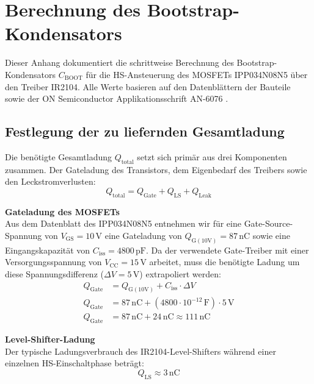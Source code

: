 
\section{Berechnung des Bootstrap-Kondensators}
\label{app:bootstrap}

Dieser Anhang dokumentiert die schrittweise Berechnung des Bootstrap-Kondensators $C_{\mathrm{BOOT}}$ für die HS-Ansteuerung des MOSFETs IPP034N08N5 über den Treiber IR2104. Alle Werte basieren auf den Datenblättern der Bauteile sowie der ON Semiconductor Applikationsschrift AN-6076 \cite{AN6076}.

\subsection{Festlegung der zu liefernden Gesamtladung}
Die benötigte Gesamtladung $Q_{\mathrm{total}}$ setzt sich primär aus drei Komponenten zusammen. Der Gateladung des Transistors, dem Eigenbedarf des Treibers sowie den Leckstromverlusten:
\begin{equation}
    Q_{\mathrm{total}} = Q_{\mathrm{Gate}} + Q_{\mathrm{LS}} + Q_{\mathrm{Leak}}
\end{equation}

\textbf{Gateladung des MOSFETs}\\
Aus dem Datenblatt des IPP034N08N5 entnehmen wir für eine Gate-Source-Spannung von $V_{\mathrm{GS}} = 10\,\mathrm{V}$ eine Gateladung von $Q_{\mathrm{G(10V)}} = 87\,\mathrm{nC}$ sowie eine Eingangskapazität von $C_{\mathrm{iss}} = 4800\,\mathrm{pF}$. Da der verwendete Gate-Treiber mit einer Versorgungsspannung von $V_{\mathrm{CC}} = 15\,\mathrm{V}$ arbeitet, muss die benötigte Ladung um diese Spannungsdifferenz ($\Delta V = 5\,\mathrm{V}$) extrapoliert werden:
\begin{align}
    Q_{\mathrm{Gate}} &= Q_{\mathrm{G(10V)}} + C_{\mathrm{iss}} \cdot \Delta V \\
    Q_{\mathrm{Gate}} &= 87\,\mathrm{nC} + (4800 \cdot 10^{-12}\,\mathrm{F}) \cdot 5\,\mathrm{V} \\
    Q_{\mathrm{Gate}} &= 87\,\mathrm{nC} + 24\,\mathrm{nC} \approx 111\,\mathrm{nC}
\end{align}

\textbf{Level-Shifter-Ladung}\\
Der typische Ladungsverbrauch des IR2104-Level-Shifters während einer einzelnen HS-Einschaltphase beträgt:
\begin{equation}
    Q_{\mathrm{LS}} \approx 3\,\mathrm{nC}
\end{equation}

